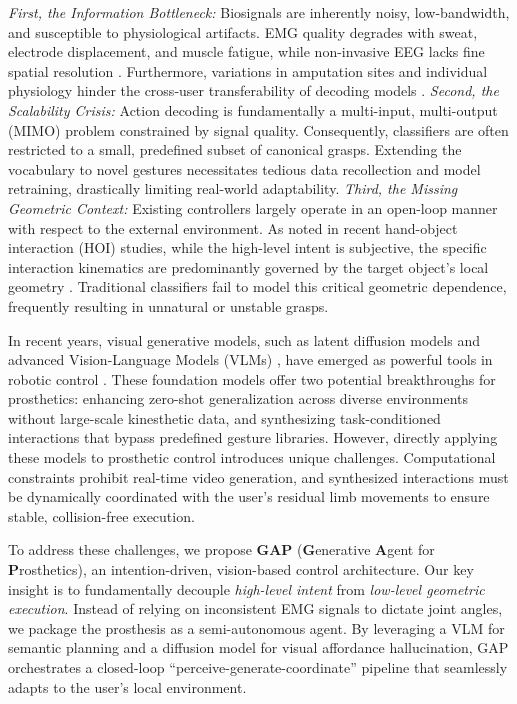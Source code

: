 \documentclass[letterpaper, 10 pt, conference]{ieeeconf}  %
\begin{document}
\textit{First, the Information Bottleneck:} Biosignals are inherently noisy, low-bandwidth, and susceptible to physiological artifacts. EMG quality degrades with sweat, electrode displacement, and muscle fatigue, while non-invasive EEG lacks fine spatial resolution \cite{atzori2014characterization, atzori2015ninapro}. Furthermore, variations in amputation sites and individual physiology hinder the cross-user transferability of decoding models \cite{vujaklija2016new}.
\textit{Second, the Scalability Crisis:} Action decoding is fundamentally a multi-input, multi-output (MIMO) problem constrained by signal quality. Consequently, classifiers are often restricted to a small, predefined subset of canonical grasps. Extending the vocabulary to novel gestures necessitates tedious data recollection and model retraining, drastically limiting real-world adaptability.
\textit{Third, the Missing Geometric Context:} Existing controllers largely operate in an open-loop manner with respect to the external environment. As noted in recent hand-object interaction (HOI) studies, while the high-level intent is subjective, the specific interaction kinematics are predominantly governed by the target object's local geometry \cite{ye2023affordance}. Traditional classifiers fail to model this critical geometric dependence, frequently resulting in unnatural or unstable grasps.

In recent years, visual generative models, such as latent diffusion models \cite{rombach2022high} and advanced Vision-Language Models (VLMs) \cite{wu2025qwen, wan2025wan}, have emerged as powerful tools in robotic control \cite{wei2025omnidexgrasp, liang2024dreamitate, jang2025dreamgen, patel2025robotic, bu2024closed, li2025manipdreamer, kang2025incorporating, xu2025dexumi}. These foundation models offer two potential breakthroughs for prosthetics: enhancing zero-shot generalization across diverse environments without large-scale kinesthetic data, and synthesizing task-conditioned interactions that bypass predefined gesture libraries. However, directly applying these models to prosthetic control introduces unique challenges. Computational constraints prohibit real-time video generation, and synthesized interactions must be dynamically coordinated with the user's residual limb movements to ensure stable, collision-free execution.

To address these challenges, we propose \textbf{GAP} (\textbf{G}enerative \textbf{A}gent for \textbf{P}rosthetics), an intention-driven, vision-based control architecture. Our key insight is to fundamentally decouple \textit{high-level intent} from \textit{low-level geometric execution}. Instead of relying on inconsistent EMG signals to dictate joint angles, we package the prosthesis as a semi-autonomous agent. By leveraging a VLM for semantic planning and a diffusion model for visual affordance hallucination, GAP orchestrates a closed-loop ``perceive-generate-coordinate'' pipeline that seamlessly adapts to the user's local environment.
\end{document}

